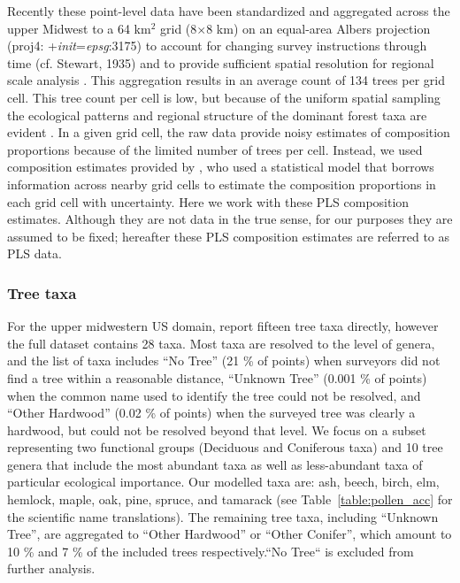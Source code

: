 \documentclass[12pt]{article}
\begin{document}
Recently these point-level data have been standardized and aggregated
across the upper Midwest to a 64 km$^2$ grid (8$\times$8 km) on an
equal-area Albers projection (proj4:
+\textit{init}=\textit{epsg}:3175) to account for changing survey
instructions through time (cf. Stewart, 1935) and to provide
sufficient spatial resolution for regional scale analysis
\citep{goring_witness}.  This aggregation results in an average count
of 134 trees per grid cell. This tree count per cell is low, but
because of the uniform spatial sampling the ecological patterns and
regional structure of the dominant forest taxa are evident
\citep{goring_witness}. In a given grid cell, the raw data provide
noisy estimates of composition proportions because of the limited
number of trees per cell. Instead, we used composition estimates
provided by \citet{paciorek2015}, who used a statistical model that
borrows information across nearby grid cells to estimate the
composition proportions in each grid cell with uncertainty. Here we
work with these PLS composition estimates. Although they are not data
in the true sense, for our purposes they are assumed to be fixed;
hereafter these PLS composition estimates are referred to as PLS data.

\subsubsection{Tree taxa}

For the upper midwestern US domain, \citet{goring_witness} report
fifteen tree taxa directly, however the full dataset contains 28 taxa.
Most taxa are resolved to the level of genera, and the list of taxa
includes ``No Tree'' (21 \% of points) when surveyors did not find a
tree within a reasonable distance, ``Unknown Tree'' (0.001 \% of
points) when the common name used to identify the tree could not be
resolved, and ``Other Hardwood'' (0.02 \% of points) when the surveyed
tree was clearly a hardwood, but could not be resolved beyond that
level. We focus on a subset representing two functional groups
(Deciduous and Coniferous taxa) and 10 tree genera that include the
most abundant taxa as well as less-abundant taxa of particular
ecological importance. Our modelled taxa are: ash, beech, birch, elm,
hemlock, maple, oak, pine, spruce, and tamarack (see
Table~\ref{table:pollen_acc} for the scientific name
translations). The remaining tree taxa, including ``Unknown Tree'',
are aggregated to ``Other Hardwood'' or ``Other Conifer'', which
amount to 10 \% and 7 \% of the included trees respectively.``No
Tree`` is excluded from further analysis.
\end{document}
